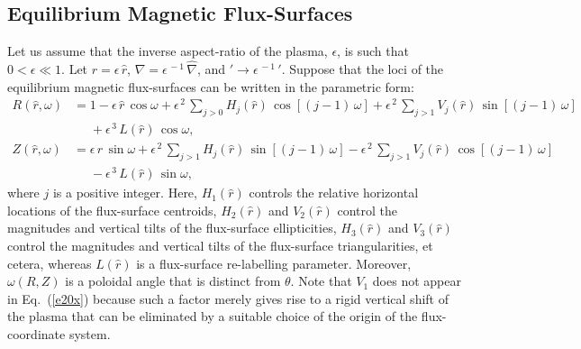 \documentclass[12pt,prb,aps]{revtex4-1}
\begin{document}
\subsection{Equilibrium Magnetic Flux-Surfaces}\label{flux}
Let us assume that the inverse aspect-ratio of the plasma, $\epsilon$, is such that $0<\epsilon\ll 1$.  
Let $r=\epsilon\,\hat{r}$, $\nabla =\epsilon^{\,-1}\,\hat{\nabla}$, and $'\rightarrow \epsilon^{\,-1}\,'$. 
Suppose that the loci of the equilibrium magnetic flux-surfaces can be written in the parametric form:\,\cite{con0,gim,am1,fitz2024}
\begin{align}
R(\hat{r},\omega) &= 1 -\epsilon\,\hat{r}\,\cos\omega + \epsilon^{\,2}\,\sum_{j>0}H_j(\hat{r})\,\cos[(j-1)\,\omega] + \epsilon^{\,2}\,\sum_{j>1}V_j(\hat{r})\,\sin[(j-1)\,\omega] \nonumber\\[0.5ex]
&\phantom{=}+\epsilon^{\,3}\,L(\hat{r})\,\cos\omega,\label{e19x}\\[0.5ex]
Z(\hat{r},\omega)&= \epsilon\,\hat{r}\,\sin\omega +\epsilon^{\,2}\,\sum_{j>1}H_j(\hat{r})\,\sin[(j-1)\,\omega]
-\epsilon^{\,2}\,\sum_{j>1}V_j(\hat{r})\,\cos[(j-1)\,\omega]\nonumber\\[0.5ex]&\phantom{=}-\epsilon^{\,3}\,L(\hat{r})\,\sin\omega,\label{e20x}
\end{align}
where $j$ is a positive integer. 
Here, $H_1(\hat{r})$  controls the relative horizontal locations of the flux-surface centroids, $H_2(\hat{r})$ and $V_2(\hat{r})$ control the 
magnitudes and vertical tilts of the flux-surface ellipticities, $H_3(\hat{r})$ and
$V_3(\hat{r})$ control the magnitudes and vertical tilts of the flux-surface triangularities, et cetera, whereas $L(\hat{r})$ is a
flux-surface re-labelling parameter. Moreover, $\omega(R,Z)$ is a  poloidal angle that is distinct from $\theta$. Note that $V_1$ does not appear in Eq.~(\ref{e20x})
because such a factor merely gives rise to a rigid vertical shift of the plasma that can be eliminated by a suitable choice of the
origin of the flux-coordinate system.\cite{fitz2024}
\end{document}
